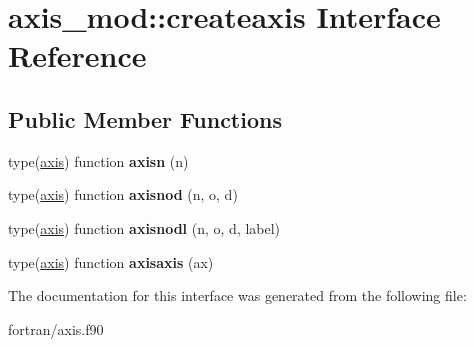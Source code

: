 \hypertarget{interfaceaxis__mod_1_1createaxis}{}\section{axis\+\_\+mod\+:\+:createaxis Interface Reference}
\label{interfaceaxis__mod_1_1createaxis}
\subsection*{Public Member Functions}
\begin{DoxyCompactItemize}
\item 
\mbox{\label{interfaceaxis__mod_1_1createaxis_a2709eec1f86af707d3c38ca3ad0defa5}} 
type(\hyperlink{structaxis__mod_1_1axis}{axis}) function {\bfseries axisn} (n)
\item 
\mbox{\label{interfaceaxis__mod_1_1createaxis_a6eeb94e26e11e6f9dbbf8cb572cc1941}} 
type(\hyperlink{structaxis__mod_1_1axis}{axis}) function {\bfseries axisnod} (n, o, d)
\item 
\mbox{\label{interfaceaxis__mod_1_1createaxis_a14b1039afbff7e2b4dccf978a538cae7}} 
type(\hyperlink{structaxis__mod_1_1axis}{axis}) function {\bfseries axisnodl} (n, o, d, label)
\item 
\mbox{\label{interfaceaxis__mod_1_1createaxis_ad0242998e9e69d74983dd17bd320d50a}} 
type(\hyperlink{structaxis__mod_1_1axis}{axis}) function {\bfseries axisaxis} (ax)
\end{DoxyCompactItemize}


The documentation for this interface was generated from the following file\+:\begin{DoxyCompactItemize}
\item 
fortran/axis.\+f90\end{DoxyCompactItemize}

